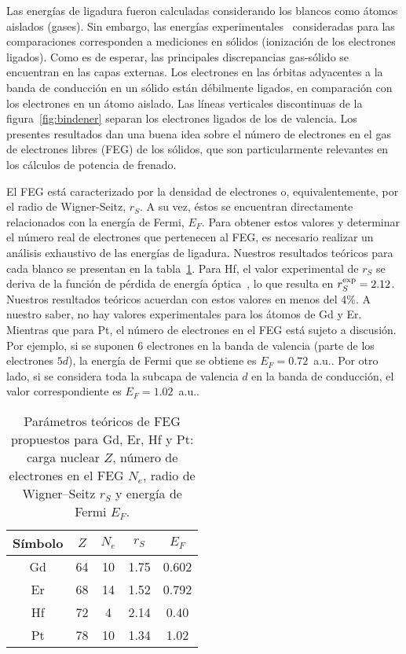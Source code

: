 Las energías de ligadura fueron calculadas considerando los blancos como 
átomos aislados (gases). Sin embargo, las energías 
experimentales~\cite{Williams:95} consideradas para las comparaciones 
corresponden a mediciones en sólidos (ionización de los electrones 
ligados). Como es de esperar, las principales discrepancias gas-sólido 
se encuentran en las capas externas. Los electrones en las órbitas 
adyacentes a la banda de conducción en un sólido están débilmente 
ligados, en comparación con los electrones en un átomo aislado. Las 
líneas verticales discontinuas de la figura~\ref{fig:bindener} separan 
los electrones ligados de los de valencia. Los presentes resultados dan 
una buena idea sobre el número de electrones en el gas de electrones 
libres (FEG) de los sólidos, que son particularmente relevantes en los 
cálculos de potencia de frenado.

El FEG está caracterizado por la densidad de electrones o, 
equivalentemente, por el radio de Wigner-Seitz, $r_S$. A su vez, éstos 
se encuentran directamente relacionados con la energía de Fermi, $E_F$. 
Para obtener estos valores y determinar el número real de electrones que 
pertenecen al FEG, es necesario realizar un análisis exhaustivo de las 
energías de ligadura. Nuestros resultados teóricos para cada blanco se 
presentan en la tabla~\ref{tab:electronFEG}. Para Hf, el valor 
experimental de $r_S$ se deriva de la función de pérdida de energía 
óptica~\cite{Lynch:75,Isaacson:75}, lo que resulta en 
$r_S^{\mbox{\scriptsize exp}}=2.12$. Nuestros resultados teóricos 
acuerdan con estos valores en menos del 4\%. A nuestro saber, no hay 
valores experimentales para los átomos de Gd y Er. Mientras que para Pt, 
el número de electrones en el FEG está sujeto a discusión. 
Por ejemplo, si se suponen 6 electrones en la banda de valencia (parte 
de los electrones $5d$), la energía de Fermi que se obtiene es 
$E_F=0.72$~a.u.. Por otro lado, si se considera toda la subcapa de 
valencia $d$ en la banda de conducción, el valor correspondiente es 
$E_F=1.02$~a.u..

\begin{table}[t]
\centering
\begin{tabular}{|c|c|c|c|c|}
\hline
Símbolo & $Z$ & $N_e$ & $r_S$ & $E_F$ \\
\hline
\hline
Gd & 64 & 10 & 1.75 & 0.602 \\
Er & 68 & 14 & 1.52 & 0.792 \\
\hline
Hf & 72 & 4  & 2.14 & 0.40 \\
Pt & 78 & 10 & 1.34 & 1.02 \\
\hline
\end{tabular}
\caption[Parámetros teóricos de FEG para blancos relativistas.]
{Parámetros teóricos de FEG propuestos para Gd, Er, Hf y Pt: 
carga nuclear $Z$, número de electrones en el FEG $N_e$, radio de 
Wigner--Seitz $r_S$ y energía de Fermi $E_F$.}
\label{tab:electronFEG} 
\end{table}

